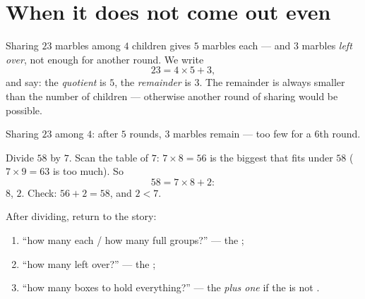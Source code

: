 \section{When it does not come out even}

\begin{definition}[Remainder]\label{def:g3:division:remainder}
Sharing $23$ marbles among $4$ children gives $5$ marbles each ---
and $3$ marbles \emph{left over}, not enough for another round. We
write
\[
23 = 4 \times 5 + 3 ,
\]
and say: the \emph{quotient} is $5$, the
\emph{remainder} is $3$. The remainder is always
smaller than the number of children --- otherwise another round of
sharing would be possible.
\end{definition}

\begin{omfigure}

{\small Sharing $23$ among $4$: after $5$ rounds, $3$ marbles remain
--- too few for a $6$th round.}
\end{omfigure}

\begin{example}\label{ex:g3:division:remainder}
Divide $58$ by $7$. Scan the table of $7$:
$7 \times 8 = 56$ is the biggest  that fits under $58$
($7 \times 9 = 63$ is too much). So
\[
58 = 7 \times 8 + 2 :
\]
 $8$,  $2$. Check: $56 + 2 = 58$, and $2 < 7$.
\end{example}

\begin{method}\label{met:g3:division:interpret}
After dividing, return to the story:
\begin{enumerate}
  \item ``how many each / how many full groups?'' --- the ;
  \item ``how many left over?'' --- the ;
  \item ``how many boxes to hold everything?'' --- the 
        \emph{plus one} if the  is not .
\end{enumerate}
\end{method}

